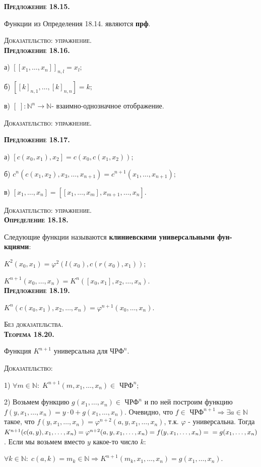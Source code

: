 \documentclass[18pt, a4paper]{extarticle}
\newcommand{\opred}[1]{\textbf{\textsc{Определение #1}}}
\newcommand{\predl}[1]{\textbf{\textsc{Предложение #1}}}
\newcommand{\teor}[1]{\textbf{\textsc{Теорема #1}}}
\newcommand{\vp}{\varphi}
\newcommand{\dok}{\textsc{Доказательство:}}
\newcommand{\dokup}{\textsc{Доказательство: упражнение.}}
\newcommand{\bezdok}{\textsc{Без доказательства.}}
\begin{document}
\textbf{\textsc{Предложение 18.15.}} 

Функции из Определения 18.14. являются \textbf{прф}.

\dokup\\

\predl{18.16.} 

а) $[[x_1,\dots,x_n]]_{n,l}=x_l;$

б) $[[k]_{n,1},\dots,[k]_{n,n}]=k;$

в) $[\;]:\mathbb N^n\to \mathbb N$- взаимно-однозначное отображение.

\dokup

\predl{18.17.}

а) $[c(x_0,x_1),x_2]=c(x_0,c(x_1,x_2));$

б) $c^n(c(x_1,x_2),x_3,\dots,x_{n+1})=c^{n+1}(x_1,\dots,x_{n+1});$

в) $[x_1,\dots,x_n]=[[x_1,\dots,x_m],x_{m+1},\dots,x_n]$.

\dokup\\

\opred{18.18.} 

Следующие функции называются \textbf{клиниевскими универсальными фун-\;\;кциями}:

$K^2(x_0,x_1)=\vp^2(l(x_0),c(r(x_0),x_1));$

$K^{n+1}(x_0,\dots,x_n)=K^n([x_0,x_1],x_2,\dots,x_n)$.\\

\predl{18.19.} 

$K^n(c(x_0,x_1),x_2,\dots,x_n)=\vp^{n+1}(x_0,\dots,x_n)$.

\bezdok\\

\teor{18.20.} 

Функция $K^{n+1}$ универсальна для \textbf{$\text{ЧРФ}^n$}.

\dok

1) $\forall m\in\mathbb N:\;K^{n+1}(m,x_1,\dots,x_n)\in$ \textbf{$\text{ЧРФ}^n$};

2) Возьмем функцию $g(x_1,\dots,x_n)\in$ \textbf{$\text{ЧРФ}^n$} и по ней построим функцию $f(y,x_1,\dots,x_n)=y\cdot0+g(x_1,\dots,x_n)$. Очевидно, что $f\in$ \textbf{$\text{ЧРФ}^{n+1}$}$\Rightarrow\exists a\in\mathbb N$ такое, что $f(y,x_1,\dots,x_n)=\vp^{n+2}(a,y,x_1,\dots,x_n)$, т.к. $\vp$ - универсальна. Тогда $K^{n+1}(c(a,y),x_1,\dots,x_n)=\vp^{n+2}(a,y,x_1,\dots,x_n)=f(y,x_1,\dots,x_n)=\newline=g(x_1,\dots,x_n)$. Если мы возьмем вместо $y$ какое-то число $k:$

$\forall k\in\mathbb N:\;c(a,k)=m_k\in\mathbb N\Rightarrow K^{n+1}(m_k,x_1,\dots,x_n)=g(x_1,\dots,x_n)$.
\end{document}
